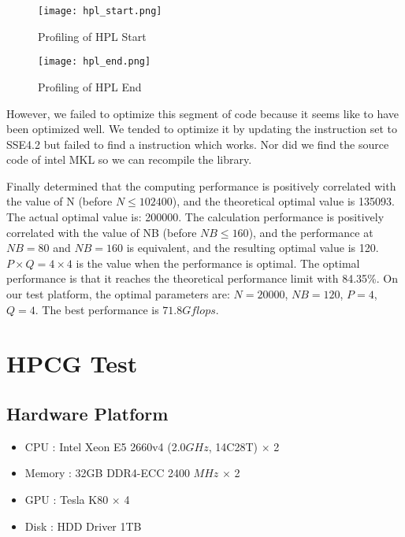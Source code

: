 \documentclass{mcmthesis}
\begin{document}
\begin{figure}[!h]
\small
\centering
\texttt{[image: hpl\_start.png]}
\caption{Profiling of HPL Start}
\label{fig:Profiling of HPL Start}
\end{figure}

\begin{figure}[!h]
\small
\centering
\texttt{[image: hpl\_end.png]}
\caption{Profiling of HPL End}
\label{fig:Profiling of HPL End}
\end{figure}




\par However, we failed to optimize this segment of code because it seems like to have been optimized well. We tended to optimize it by updating the instruction set to SSE4.2 but failed to find a instruction which works. Nor did we find the source code of intel MKL so we can recompile the library.

\par Finally determined that the computing performance is positively correlated with the value of N (before $N\leqslant 102400$), and the theoretical optimal value is 135093. The actual optimal value is: 200000. The calculation performance is positively correlated with the value of NB (before $NB \leqslant 160$), and the performance at $NB=80$ and $NB=160$ is equivalent, and the resulting optimal value is 120. $P\times Q = 4 \times 4$ is the value when the performance is optimal. The optimal performance is that it reaches the theoretical performance limit with 84.35\%. On our test platform, the optimal parameters are: $N = 20000$, $NB = 120$, $P = 4$, $Q = 4$. The best performance is $71.8Gflops$.

\section{HPCG Test}

\subsection{Hardware Platform}

\begin{itemize}
	\item CPU : Intel Xeon E5 2660v4 (2.0$GHz$, 14C28T) $\times$ 2 
	\item Memory : 32GB DDR4-ECC 2400 $MHz$ $\times$ 2
	\item GPU : Tesla K80 $\times$ 4
	\item Disk : HDD Driver 1TB 
\end{itemize}
\end{document}
